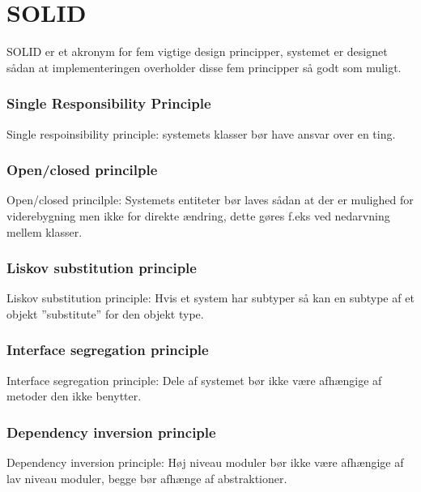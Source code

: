 \documentclass[Implementering/Implementering_main.tex]{subfiles}
\begin{document}
\section{SOLID}

SOLID er et akronym for fem vigtige design principper, systemet er designet sådan at implementeringen overholder disse fem principper så godt som muligt.

\subsubsection{Single Responsibility Principle}
Single respoinsibility principle: systemets klasser bør have ansvar over en ting. 

\subsubsection{Open/closed princilple}
Open/closed princilple: Systemets entiteter bør laves sådan at der er mulighed for viderebygning men ikke for direkte ændring, dette gøres f.eks ved nedarvning mellem klasser.

\subsubsection{Liskov substitution principle}
Liskov substitution principle: Hvis et system har subtyper så kan en subtype af et objekt ”substitute” for den objekt type.

\subsubsection{Interface segregation principle}
Interface segregation principle: Dele af systemet bør ikke være afhængige af metoder den ikke benytter. 

\subsubsection{Dependency inversion principle}
Dependency inversion principle: Høj niveau moduler bør ikke være afhængige af lav niveau moduler, begge bør afhænge af abstraktioner. 
\end{document}
